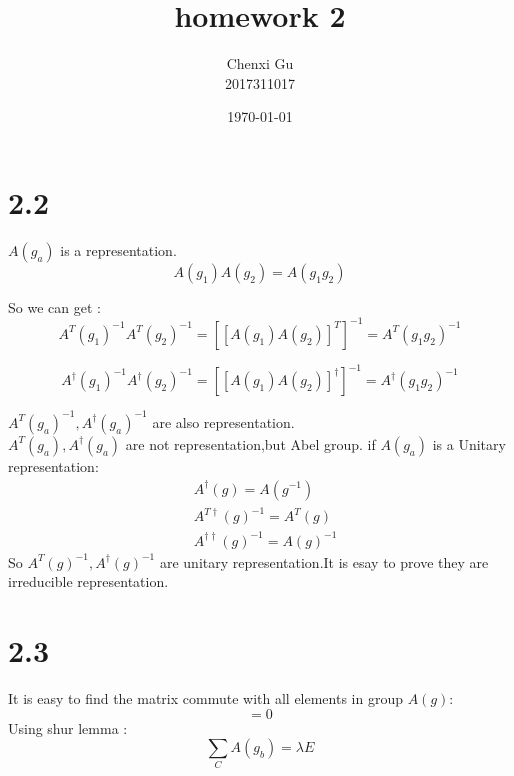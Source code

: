 \documentclass{article}
\begin{document}
\begin{CJK*}{GBK}{song}

\pagestyle{fancy}  
\fancyhead{} %
\renewcommand{\headrulewidth}{0.4pt}  
\renewcommand{\footrulewidth}{0.4pt} 



\title {homework 2}
\author{Chenxi Gu\\2017311017}

\date{\today}

\maketitle

\section{2.2}
$A(g_a)$ is a representation.
\begin{equation}
A(g_1)A(g_2)=A(g_1g_2)
\end{equation}

So we can get :
\begin{equation}
A^T(g_1)^{-1}A^T(g_2)^{-1}=[[A(g_1)A(g_2)]^T]^{-1}=A^T(g_1g_2)^{-1}
\end{equation}





\begin{equation}
A^{\dagger}(g_1)^{-1}A^{\dagger}(g_2)^{-1}=[[A(g_1)A(g_2)]^{\dagger}]^{-1}=A^{\dagger}(g_1g_2)^{-1}
\end{equation}

$A^T(g_a)^{-1},A^{\dagger}(g_a)^{-1}$ are also representation.\\


$A^T(g_a),A^{\dagger}(g_a)$ are not representation,but Abel group.
if $A(g_a)$ is a Unitary representation:
\begin{equation}
\begin{aligned}
&A^{\dagger}(g)=A(g^{-1})\\
&A^{T\dagger}(g)^{-1}=A^T(g)\\
&A^{\dagger \dagger}(g)^{-1}=A(g)^{-1}
\end{aligned}
\end{equation}
So $A^T(g)^{-1},A^{\dagger}(g)^{-1}$ are unitary representation.It is esay to prove they are irreducible representation.

\section{2.3}
It is easy to find the matrix commute with all elements in group $A(g)$:
\begin{equation}
[A(g_a),\sum_CA(g_b)]=0
\end{equation} 
Using shur lemma :
\begin{equation}
\sum_CA(g_b)=\lambda E
\end{equation}


\end{CJK*}
\end{document}
